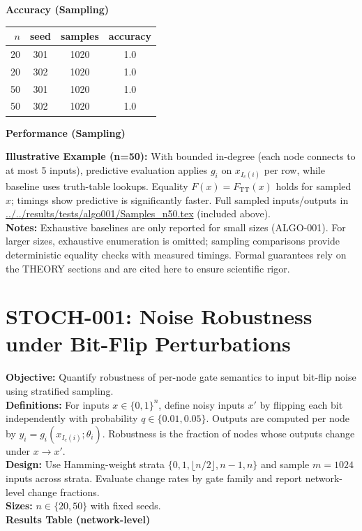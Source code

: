 \documentclass[11pt]{article}
\begin{document}
\textbf{Accuracy (Sampling)}\\
\begin{center}
\begin{tabular}{rccc}
\toprule
$n$ & seed & samples & accuracy \\
\midrule
20 & 301 & 1020 & 1.0 \\
20 & 302 & 1020 & 1.0 \\
50 & 301 & 1020 & 1.0 \\
50 & 302 & 1020 & 1.0 \\
\bottomrule
\end{tabular}
\end{center}
\textbf{Performance (Sampling)}
 
\textbf{Illustrative Example (n=50):} With bounded in-degree (each node connects to at most 5 inputs), predictive evaluation applies \(g_i\) on \(x_{I_c(i)}\) per row, while baseline uses truth-table lookups. Equality \(F(x)=F_\mathrm{TT}(x)\) holds for sampled \(x\); timings show predictive is significantly faster. Full sampled inputs/outputs in \url{../../results/tests/algo001/Samples_n50.tex} (included above).\\
\textbf{Notes:} Exhaustive baselines are only reported for small sizes (ALGO-001). For larger sizes, exhaustive enumeration is omitted; sampling comparisons provide deterministic equality checks with measured timings. Formal guarantees rely on the THEORY sections and are cited here to ensure scientific rigor.

\section{STOCH-001: Noise Robustness under Bit-Flip Perturbations}
\textbf{Objective:} Quantify robustness of per-node gate semantics to input bit-flip noise using stratified sampling.\\
\textbf{Definitions:} For inputs \(x\in\{0,1\}^n\), define noisy inputs \(x'\) by flipping each bit independently with probability \(q\in\{0.01,0.05\}\). Outputs are computed per node by \(y_i=g_i(x_{I_c(i)};\theta_i)\). Robustness is the fraction of nodes whose outputs change under \(x\to x'\).\\
\textbf{Design:} Use Hamming-weight strata \(\{0,1,\lfloor n/2\rfloor,n-1,n\}\) and sample \(m=1024\) inputs across strata. Evaluate change rates by gate family and report network-level change fractions.\\
\textbf{Sizes:} \(n\in\{20,50\}\) with fixed seeds.\\
\textbf{Results Table (network-level)}
 
\end{document}
